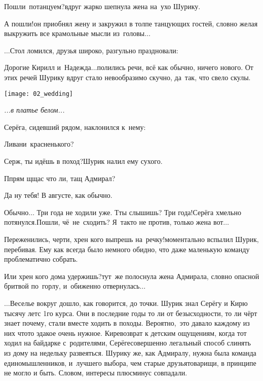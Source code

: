 {\begin{minipage}{0.48\textwidth}
	\indent \diagdash Пошли~потанцуем?\mdash вдруг жарко шепнула жена на~ухо Шурику.
	
	\indent \diagdash А пошли!\mdash он приобнял жену и закружил в толпе танцующих гостей, словно желая выкружить все крамольные мысли из~головы$\ldots$
	
	\indent $\ldots$Стол ломился, друзья широко, разгульно праздновали:
	
	\indent \diagdash Дорогие Кирилл и~Надежда$\ldots$\mdash полились речи, всё как обычно, ничего нового. От этих речей Шурику вдруг стало невообразимо скучно, да~так, что свело скулы.
\end{minipage}\hfill
\begin{minipage}{0.5\textwidth}
	\centering
	\texttt{[image: 02\_wedding]}
	
	{\small\textit{...в платье белом...}}
\end{minipage}

Серёга, сидевший рядом, наклонился к~нему:

\diagdash Ливани~красненького?

\diagdash Серж, ты идёшь в поход?\mdash Шурик налил ему сухого. 

\diagdash П\sdash прям щ\sdash щас что ли, тащ Адмирал?

\diagdash Да ну тебя! В августе, как обычно.

\diagdash Обычно$\ldots$ Три года не ходили уже. Т\sdash ты слышишь? Три года!\mdash Серёга хмельно потянулся.\mdash Пошли, чё~не~сходить? Я~так\sdash то не против, только жена вот$\ldots$

\diagdash Переженились, черти, хрен кого выпрешь на~речку!\mdash моментально вспылил Шурик, перебивая. Ему как всегда было немного обидно, что даже маленькую команду проблематично собрать.

\diagdash Или хрен кого дома удержишь?\mdash тут~же полоснула жена Адмирала, словно опасной бритвой по~горлу, и~обиженно отвернулась$\ldots$ 

\vspace{0.5cm}
$\ldots$Веселье вокруг дошло, как говорится, до точки. Шурик знал Серёгу и Кирю тысячу лет\mdash с 1\sdash го курса. Они в последние годы то ли от безысходности, то ли чёрт знает почему, стали вместе ходить в походы. Вероятно,~это давало каждому из них что\sdash то эдакое очень нужное. Кире\mdash возврат к детским ощущениям, когда тот ходил на байдарке с~родителями, Серёге\mdash совершенно легальный способ слинять из дому на недельку развеяться. Шурику же, как Адмиралу, нужна была команда единомышленников, и~лучшего выбора, чем старые друзья\sdash товарищи, в принципе не могло и быть. Словом, интересы плюс\sdash минус совпадали. 

}
